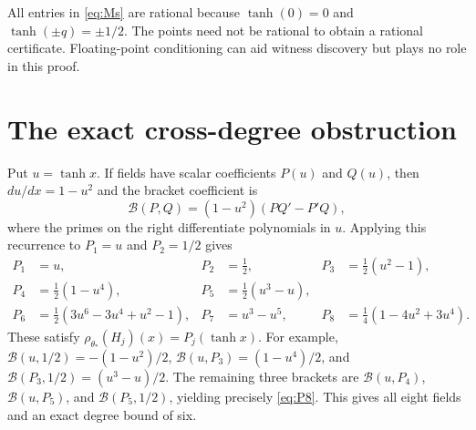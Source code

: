 \documentclass[11pt,a4paper]{article}
\numberwithin{equation}{section}
\theoremstyle{definition}
\theoremstyle{remark}
\begin{document}
All entries in \eqref{eq:Ms} are rational because $\tanh(0)=0$ and
$\tanh(\pm q)=\pm1/2$. The points need not be rational to obtain a
rational certificate. Floating-point conditioning can aid witness discovery
but plays no role in this proof.

\section{The exact cross-degree obstruction}
\label{sec:cross}
Put $u=\tanh x$. If fields have scalar coefficients $P(u)$ and $Q(u)$,
then $du/dx=1-u^2$ and the bracket coefficient is
\begin{equation}\label{eq:polybracket}
 \mathcal B(P,Q)=(1-u^2)(P Q'-P'Q),
\end{equation}
where the primes on the right differentiate polynomials in $u$.
Applying this recurrence to $P_1=u$ and $P_2=1/2$ gives
\begin{align}\label{eq:P8}
 P_1&=u,&P_2&=\tfrac12,&P_3&=\tfrac12(u^2-1),\nonumber\\
 P_4&=\tfrac12(1-u^4),&P_5&=\tfrac12(u^3-u),\nonumber\\
 P_6&=\tfrac12(3u^6-3u^4+u^2-1),&
 P_7&=u^3-u^5,&P_8&=\tfrac14(1-4u^2+3u^4).
\end{align}
These satisfy $\rho_{\theta_*}(H_j)(x)=P_j(\tanh x)$.
For example, $\mathcal B(u,1/2)=-(1-u^2)/2$,
$\mathcal B(u,P_3)=(1-u^4)/2$, and
$\mathcal B(P_3,1/2)=(u^3-u)/2$. The remaining three brackets are
$\mathcal B(u,P_4)$, $\mathcal B(u,P_5)$, and
$\mathcal B(P_5,1/2)$, yielding precisely \eqref{eq:P8}. This gives all
eight fields and an exact degree bound of six.
\end{document}
